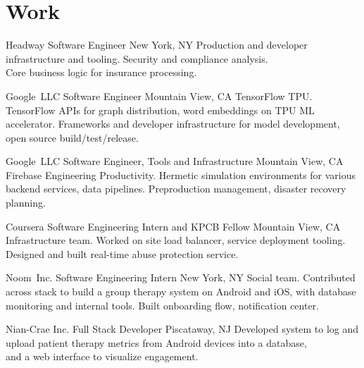 \documentclass[11pt,letterpaper]{moderncv}
\begin{document}
\maketitle

\section{Work}

        {Headway}
        {Software Engineer}
        {New York, NY}
        {}
	{Production and developer infrastructure and tooling. Security and compliance analysis. \\Core business logic for insurance processing. \\}

        {Google~LLC}
        {Software Engineer}
        {Mountain View, CA}
        {}
        {TensorFlow TPU. TensorFlow APIs for graph distribution, word embeddings on TPU ML accelerator. Frameworks and developer infrastructure for model development, open source build/test/release. \\}

        {Google~LLC}
        {Software Engineer, Tools and Infrastructure}
        {Mountain View, CA}
        {}
        {Firebase Engineering Productivity. Hermetic simulation environments for various backend services, data pipelines. Preproduction management, disaster recovery planning.\\}

        {Coursera}
        {Software Engineering Intern and KPCB Fellow}
        {Mountain View, CA}
        {}
        {Infrastructure team. Worked on site load balancer, service deployment tooling. \\Designed and built real-time abuse protection service. \\}

        {Noom~Inc.}
        {Software Engineering Intern}
        {New York, NY}
        {}
        {Social team. Contributed across stack to build a group therapy system on Android and iOS, with database monitoring and internal tools. Built onboarding flow, notification center.\\}

        {Nian-Crae Inc.}
        {Full Stack Developer}
        {Piscataway, NJ}
        {}
        {Developed system to log and upload patient therapy metrics from Android devices into a database,\\and a web interface to visualize engagement.\\}
\end{document}
